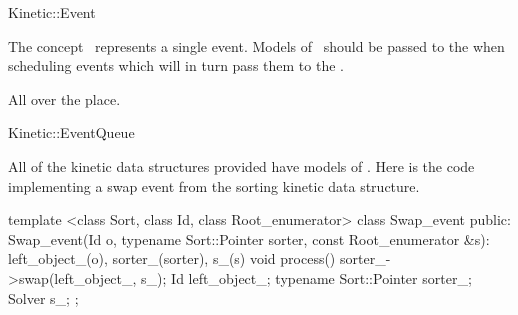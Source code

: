 
\begin{ccRefConcept}{Kinetic::Event}


\ccDefinition
  
The concept \ccClassName\ represents a single event. Models of
\ccClassName\ should be passed to the  when
scheduling events which will in turn pass them to the
.


\ccOperations



\ccHasModels

All over the place. 

\ccSeeAlso

Kinetic::EventQueue

\ccExample

All of the kinetic data structures provided have models of
\ccRefName. Here is the code implementing a swap event from the
sorting kinetic data structure.

\begin{ccExampleCode}
template <class Sort, class Id, class Root_enumerator> 
class Swap_event {
public:
  Swap_event(Id o, typename Sort::Pointer sorter, 
	     const Root_enumerator &s): left_object_(o), sorter_(sorter), s_(s){}
  void process(){
    sorter_->swap(left_object_, s_);
  }
  Id left_object_; typename Sort::Pointer sorter_; Solver s_;
};
\end{ccExampleCode}


\end{ccRefConcept}


